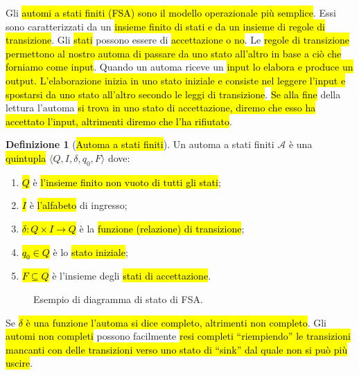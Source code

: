 \documentclass[a4paper,11pt,twoside]{article}
\theoremstyle{plain}
\theoremstyle{definition}
\newtheorem{defn}{Definizione}[section]
\theoremstyle{remark}
\begin{document}
Gli \hl{automi a stati finiti (FSA) sono il modello operazionale più semplice}.
Essi sono caratterizzati da un \hl{insieme finito di stati e da un insieme di
regole di transizione}. Gli \hl{stati} possono essere di \hl{accettazione o no}.
Le \hl{regole di transizione permettono al nostro automa di passare da uno stato
all'altro in base a ciò che forniamo come input}. Quando un automa riceve un
\hl{input lo elabora e produce un output. L'elaborazione inizia in uno stato
iniziale e consiste nel leggere l'input e spostarsi da uno stato all'altro
secondo le leggi di transizione}. \hl{Se alla fine} della lettura l'automa
\hl{si trova in uno stato di accettazione, diremo che esso ha accettato l'input,
altrimenti diremo che l'ha rifiutato}.

\begin{defn}[\hl{Automa a stati finiti}]\label{def:fsa}
  Un automa a stati finiti $\mathcal{A}$ è una \hl{quintupla}
  $\langle Q, I, \delta, q_0, F \rangle$ dove:
  \begin{enumerate}
    \item \hl{$Q$} è \hl{l'insieme finito non vuoto di tutti gli stati};
    \item \hl{$I$} è \hl{l'alfabeto} di ingresso;
    \item \hl{$\delta: Q \times I \to Q$} è la \hl{funzione (relazione) di
      transizione};
    \item \hl{$q_0 \in Q$} è lo \hl{stato iniziale};
    \item \hl{$F \subseteq Q$} è l'insieme degli \hl{stati di accettazione}.
  \end{enumerate}
\end{defn}

\begin{figure}[htb]
  \centering
  \caption{Esempio di diagramma di stato di FSA.}\label{fig:fsa-diagramma-stato}
\end{figure}

Se \hl{$\delta$ è una funzione l'automa si dice completo, altrimenti non
completo}. Gli \hl{automi non completi} possono facilmente \hl{resi completi
``riempiendo'' le transizioni mancanti con delle transizioni verso uno stato di
``sink'' dal quale non si può più uscire}.
\end{document}
